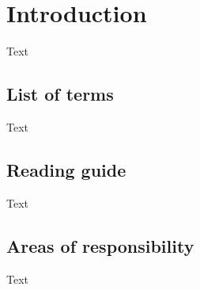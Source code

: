 \chapter{Introduction}
Text

\section{List of terms}
Text

\section{Reading guide}
Text

\section{Areas of responsibility}
Text

